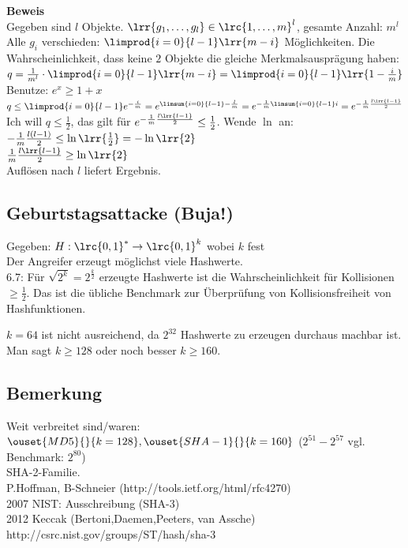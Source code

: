 		\textbf{Beweis}\\
		Gegeben sind $l$ Objekte. $\lrr{g_1,\dots,g_l}\in\lrc{1,\dots,m}^l$, gesamte Anzahl: $m^l$\\
		Alle $g_i$ verschieden: $\limprod{i=0}{l-1}\lrr{m-i}$ Möglichkeiten. Die Wahrscheinlichkeit, dass keine $2$ Objekte die gleiche Merkmalsausprägung haben: $q=\frac{1}{m^l}\cdot\limprod{i=0}{l-1}\lrr{m-i}=\limprod{i=0}{l-1}\lrr{1-\frac{i}{m}}$\\
		Benutze: $e^x\geq 1+x$\\
		$q\leq\limprod{i=0}{l-1}e^{-\frac{i}{m}}=e^{\limsum{i=0}{l-1}-\frac{l}{m}}=e^{-\frac{1}{m}\limsum{i=0}{l-1}i}=e^{-\frac{1}{m}\frac{l\lrr{l-1}}{2}}$\\
		Ich will $q\leq\frac{1}{2}$, das gilt für $e^{-\frac{1}{m}\frac{l\lrr{l-1}}{2}}\leq\frac{1}{2}$. Wende $\ln$ an:\\
		$-\frac{1}{m}\frac{l(l-1)}{2}\leq\ln\lrr{\frac{1}{2}}=-\ln\lrr{2}$\\
		$\frac{1}{m}\frac{l\lrr{l-1}}{2}\geq\ln\lrr{2}$\\
		Auflösen nach $l$ liefert Ergebnis.

	\subsection{Geburtstagsattacke (Buja!)}
		Gegeben: $H:\lrc{0,1}^*\rightarrow\lrc{0,1}^k$ wobei $k$ fest\\
		Der Angreifer erzeugt möglichst viele Hashwerte.\\
		6.7: Für $\sqrt{2^k}=2^{\frac{k}{2}}$ erzeugte Hashwerte ist die Wahrscheinlichkeit für Kollisionen $\geq\frac{1}{2}$. Das ist die übliche Benchmark zur Überprüfung von Kollisionsfreiheit von Hashfunktionen.
	
		$k=64$ ist nicht ausreichend, da $2^{32}$ Hashwerte zu erzeugen durchaus machbar ist. Man sagt $k\geq 128$ oder noch besser $k\geq 160$.
	
	\subsection{Bemerkung}
		Weit verbreitet sind/waren: $\ouset{MD5}{}{k=128}, \ouset{SHA-1}{}{k=160}$ ($2^{51}-2^{57}$ vgl. Benchmark: $2^{80}$)\\
		SHA-2-Familie.\\
		P.Hoffman, B-Schneier (http://tools.ietf.org/html/rfc4270)\\
		2007 NIST: Ausschreibung (SHA-3)\\
		2012 Keccak (Bertoni,Daemen,Peeters, van Assche)\\
		http://csrc.nist.gov/groups/ST/hash/sha-3
	
